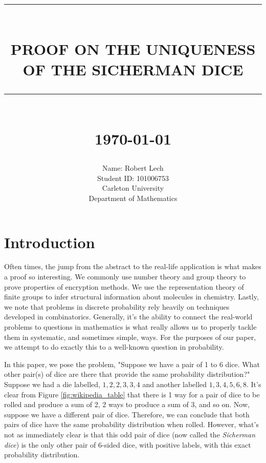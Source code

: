 \documentclass[12pt]{report}
\newcommand{\HRule}[1]{\rule{\linewidth}{#1}}
\begin{document}
\title{ \HRule{0.5pt} \\
		\LARGE \textbf{\uppercase{Proof on the Uniqueness of the Sicherman dice}}
		\HRule{2pt} \\ [0.5cm]
		\normalsize \today \vspace*{5\baselineskip}}

\date{}

\author{
		Name: Robert Lech \\
        Student ID: 101006753 \\ 
		Carleton University \\
		Department of Mathematics }

\maketitle

\sectionfont{\scshape}


\section*{Introduction}
Often times, the jump from the abstract to the real-life application is what makes a proof so interesting. We commonly use number theory and group theory to prove properties of encryption methods. We use the representation theory of finite groups to infer structural information about molecules in chemistry. Lastly, we note that problems in discrete probability rely heavily on techniques developed in combinatorics. Generally, it's the ability to connect the real-world problems to questions in mathematics is what really allows us to properly tackle them in systematic, and sometimes simple, ways. For the purposes of our paper, we attempt to do exactly this to a well-known question in probability.

In this paper, we pose the problem, "Suppose we have a pair of 1 to 6 dice. What other pair(s) of dice are there that provide the same probability distribution?" Suppose we had a die labelled, $1,2,2,3,3,4$ and another labelled $1,3,4,5,6,8$. It's clear from Figure \ref{fig:wikipedia_table} that there is 1 way for a pair of dice to be rolled and produce a sum of 2, 2 ways to produce a sum of 3, and so on. Now, suppose we have a different pair of dice. Therefore, we can conclude that both pairs of dice have the same probability distribution when rolled. However, what's not as immediately clear is that this odd pair of dice (now called the \textit{Sicherman dice}) is the only other pair of 6-sided dice, with positive labels, with this exact probability distribution.
\end{document}
